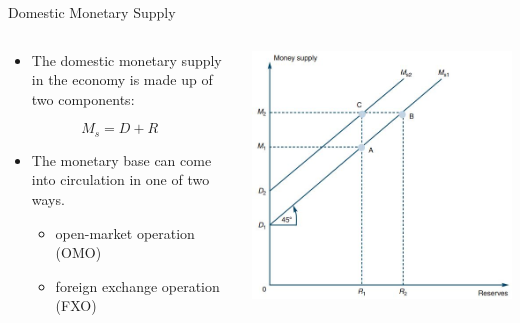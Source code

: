 \documentclass[10pt,hyperref={CJKbookmarks=true},xcolor=dvipsnames,aspectratio=169]{beamer}
\begin{document}
\begin{frame}{Domestic Monetary Supply}




\begin{columns}[onlytextwidth]
\begin{column}{0.4\textwidth}
\begin{itemize}
\item The domestic monetary supply in the economy is made up of two components:
\end{itemize}

\[
M_{s}=D+R
\]

\begin{itemize}
\item The monetary base can come into circulation in one of two ways. 

\begin{itemize}
\item open-market operation (OMO)
\item foreign exchange operation (FXO) 
\end{itemize}
\end{itemize}

\end{column}
\begin{column}{0.6\textwidth}
\includegraphics[width=0.8\columnwidth]{fig/boptheory/lec08-17}
\end{column}
\end{columns}

\end{frame}
\end{document}
